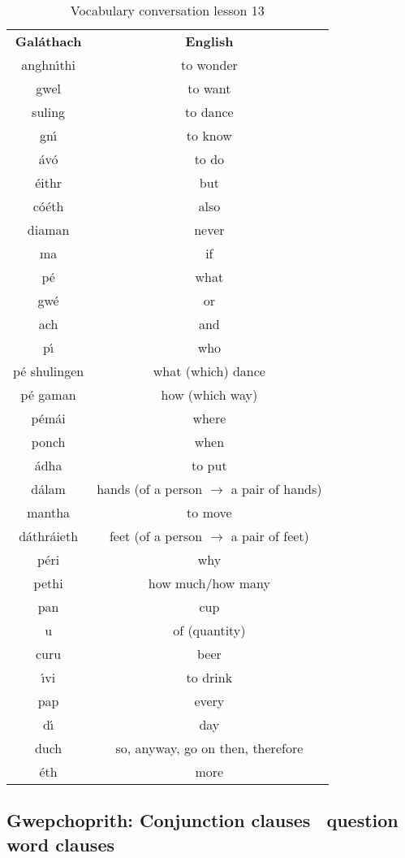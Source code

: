\begin{table}[H]
\centering
\begin{tabular}{cc}
  \toprule
  \textbf{Gal\'{a}thach} & \textbf{English}\\
  \cmidrule(lr){1-1}\cmidrule(lr){2-2}
  anghn\'{\i}thi & to wonder\\
  gwel & to want\\
  suling & to dance\\
  gn\'{\i} & to know\\
  \'{a}v\'{o} & to do\\
  \'{e}ithr & but\\
  c\'{o}\'{e}th & also\\
  diaman & never\\
  ma & if\\
  p\'{e} & what\\
  gw\'{e} & or\\
  ach & and\\
  p\'{\i} & who\\
  p\'{e} shulingen & what (which) dance\\
  p\'{e} gaman & how (which way)\\
  p\'{e}m\'{a}i & where\\
  ponch & when\\
  \'{a}dha & to put\\
  d\'{a}lam & hands (of a person $\rightarrow$ a pair of hands)\\
  mantha & to move\\
  d\'{a}thr\'{a}ieth & feet (of a person $\rightarrow$ a pair of feet)\\
  p\'{e}ri & why\\
  pethi & how much/how many\\
  pan & cup\\
  u & of (quantity)\\
  curu & beer\\
  \'{\i}vi & to drink\\
  pap & every\\
  d\'{\i} & day\\
  duch & so, anyway, go on then, therefore\\
  \'{e}th & more\\
  \bottomrule
\end{tabular}
\label{vocab_conversation_lesson13}
\caption{Vocabulary conversation lesson 13}
\end{table}

\subsection{Gwepchoprith: Conjunction clauses \textendash\ question word clauses}

